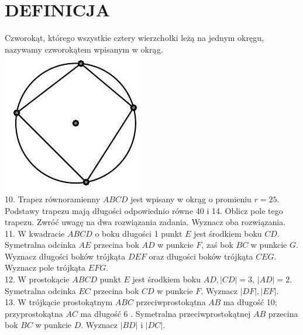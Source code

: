 \documentclass[10pt]{article}
\begin{document}
\section*{DEFINICJA}
Czworokąt, którego wszystkie cztery wierzchołki leżą na jednym okręgu, nazywamy czworokątem wpisanym w okrąg.\\
\includegraphics[max width=\textwidth, center]{2024_11_21_71f62bd117d375398909g-153}\\
10. Trapez równoramienny \(A B C D\) jest wpisany w okrąg o promieniu \(r=25\). Podstawy trapezu mają długości odpowiednio równe 40 i 14. Oblicz pole tego trapezu. Zwróć uwagę na dwa rozwiązania zadania. Wyznacz oba rozwiązania.\\
11. W kwadracie \(A B C D\) o boku długości 1 punkt \(E\) jest środkiem boku \(C D\). Symetralna odcinka \(A E\) przecina bok \(A D\) w punkcie \(F\), zaś bok \(B C\) w punkcie \(G\). Wyznacz długości boków trójkąta \(D E F\) oraz długości boków trójkąta \(C E G\). Wyznacz pole trójkąta \(E F G\).\\
12. W prostokącie \(A B C D\) punkt \(E\) jest środkiem boku \(A D,|C D|=3\), \(|A D|=2\). Symetralna odcinka \(E C\) przecina bok \(C D\) w punkcie \(F\). Wyznacz \(|D F|,|E F|\).\\
13. W trójkącie prostokątnym \(A B C\) przeciwprostokątna \(A B\) ma długość 10; przyprostokątna \(A C\) ma długość 6 . Symetralna przeciwprostokątnej \(A B\) przecina bok \(B C\) w punkcie \(D\). Wyznacz \(|B D|\) i \(|D C|\).
\end{document}
